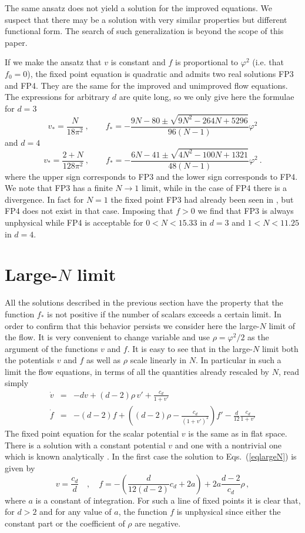 \documentclass[11pt]{book} %
\newcommand{\be}{\begin{equation}}
\newcommand{\ee}{\end{equation}}
\newcommand{\bea}{\begin{eqnarray}}
\newcommand{\eea}{\end{eqnarray}}
\begin{document}
The same ansatz does not yield a solution for the improved equations.
We suspect that there may be a solution
with very similar properties but different functional form.
The search of such generalization is beyond the scope of this paper.

If we make the ansatz that $v$ is constant and $f$ is proportional
to $\varphi^2$ (i.e. that $f_0=0$), the fixed point equation is quadratic and admits two
real solutions FP3 and FP4.
They are the same for the improved and unimproved flow equations.
The expressions for arbitrary $d$ are quite long, so
we only give here the formulae for $d=3$
\be
v_*=\frac{N}{18\pi^2}\ ,
\qquad
f_*=-\frac{9N-80\pm\sqrt{9N^2-264N+5296}}{96(N-1)}\varphi^2
\ee
and $d=4$
\be
v_*=\frac{2+N}{128\pi^2}\ ,
\qquad
f_*=-\frac{6N-41\pm\sqrt{4N^2-100N+1321}}{48(N-1)}\varphi^2\ .
\ee
where the upper sign corresponds to FP3
and the lower sign corresponds to FP4.
We note that FP3 has a finite $N\to1$ limit,
while in the case of FP4 there is a divergence.
In fact for $N=1$ the fixed point FP3 had already been seen
in \cite{pv1}, but FP4 does not exist in that case.
Imposing that $f>0$ we find that FP3 is always unphysical
while FP4 is acceptable for $0<N<15.33$ in $d=3$
and $1<N<11.25$ in $d=4$.



\section{Large-$N$ limit}

All the solutions described in the previous section
have the property that the function $f_*$ is not
positive if the number of scalars exceeds a certain limit.
In order to confirm that this behavior persists
we consider here the large-$N$ limit of the flow.
It is very convenient to change variable and use $\rho=\varphi^2/2$
as the argument of the functions $v$ and $f$.
It is easy to see that in the large-$N$ limit both the potentials $v$ and $f$ as well as $\rho$ scale linearly in $N$.
In particular in such a limit the flow equations, in terms of all the quantities already rescaled by $N$, read simply
\bea
\dot v &=&-d v + (d-2) \rho  \,v'+\frac{c_d}{1+v'}\nonumber \\
\dot f &=& -(d-2) f+\left((d-2) \rho -\frac{c_d}{\left(1+v'\right)^2}\right) f'  -\frac{ d}{12}\frac{c_d} {1+v'}
\label{eqlargeN}
\eea
The fixed point equation for the scalar potential $v$ is the same as in flat space. There is a solution with a constant potential $v$ and one with a nontrivial one which is known analytically \cite{marchais}.
In the first case the solution to Eqs.~(\ref{eqlargeN}) is given by
\be
v=\frac{c_d}{d} \quad,\quad  f=-\left(\frac{d}{12(d-2)} c_d+2 a\right) +  2a \frac{d-2}{c_d} \rho \,,
\ee
where $a$ is a constant of integration. For such a line of fixed points it is clear that, for $d>2$  and for any value of $a$, the function $f$ is unphysical since either the constant part or the coefficient of $\rho$ are negative.
\end{document}
